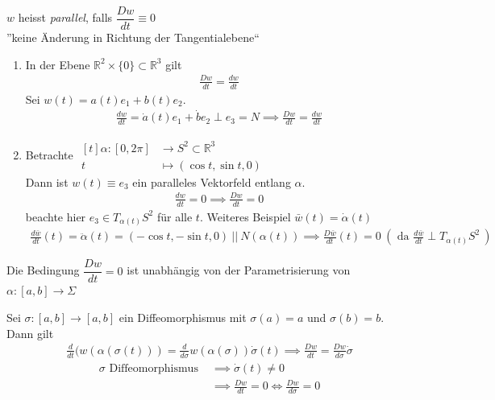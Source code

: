 \documentclass[../main.tex]{subfiles}
\begin{document}
\begin{definition}
$w$ heisst \emph{parallel}, falls $\dfrac{Dw}{dt} \equiv 0$ \\ ''keine Änderung in Richtung der Tangentialebene``
\end{definition}

\begin{examples}
\begin{enumerate}
    \item In der Ebene $\mathbb{R}^2 \times \{0\} \subset \mathbb{R}^3$ gilt \begin{align*}
        \frac{Dw}{dt} = \frac{dw}{dt}
    \end{align*}
    Sei $w(t) = a(t)e_1 + b(t)e_2$.
    \begin{align*}
        \frac{dw}{dt} = \dot{a}(t)e_1 + \dot{b}e_2 \perp e_3 = N \implies \frac{Dw}{dt} = \frac{dw}{dt}
    \end{align*}
    
    \item Betrachte $\begin{aligned}[t] \alpha : [0, 2 \pi] & \to S^2 \subset \mathbb{R}^3 \\
    t & \mapsto ( \cos t, \sin t, 0)
    \end{aligned}$ \\
    Dann ist $w(t) \equiv e_3$ ein paralleles Vektorfeld entlang $\alpha$.
    \begin{align*}
        \frac{dw}{dt} = 0 \implies \frac{Dw}{dt} = 0
    \end{align*} beachte hier $e_3 \in T_{\alpha(t)}S^2$ für alle $t$. Weiteres Beispiel $\bar{w}(t) = \dot{\alpha}(t)$ \begin{align*}
        \frac{d \bar{w}}{dt}(t) = \ddot{\alpha}(t) = ( -\cos t, -\sin t, 0) \ || \ N(\alpha(t)) \implies \frac{D\bar{w}}{dt}(t) = 0 \ (\text{ da } \frac{d\bar{w}}{dt} \perp T_{\alpha(t)}S^2 \ )
    \end{align*} 
\end{enumerate}
\end{examples}

\begin{remark}
Die Bedingung $\dfrac{Dw}{dt}=0$ ist unabhängig von der Parametrisierung von $\alpha : [a,b] \to \Sigma $

Sei $\sigma : [a,b] \to [a,b]$ ein Diffeomorphismus mit $\sigma (a) = a$ und $\sigma (b) = b$. Dann gilt
\begin{align*}
    \frac{d}{dt}(w(\alpha(\sigma(t))) = \frac{d}{d\sigma}w(\alpha(\sigma))  \dot{\sigma}(t) \implies \frac{Dw}{dt} = \frac{Dw}{d\sigma}\dot{\sigma}
\end{align*}
\begin{align*}
    \sigma \text{ Diffeomorphismus } & \implies \dot{\sigma}(t) \not = 0 \\
    & \implies \frac{Dw}{dt} = 0 \iff \frac{Dw}{d\sigma} = 0
\end{align*}
\end{remark}
\end{document}
